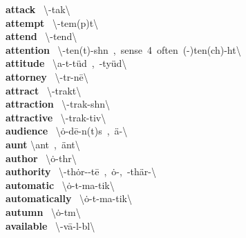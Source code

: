 \documentclass[10pt,a4paper]{article}
\begin{document}
\begin{multicols}{2}
\textbf{ attack }\quad \ \textbackslash \textschwa -\textprimstress tak\textbackslash \\
\textbf{ attempt }\quad \ \textbackslash \textschwa -\textprimstress tem(p)t\textbackslash \\
\textbf{ attend }\quad \ \textbackslash \textschwa -\textprimstress tend\textbackslash \\
\textbf{ attention }\quad \ \textbackslash \textschwa -\textprimstress ten(t)-sh\textschwa n\ ,\ sense\ 4\ often\ (\textschwa -)\textsecstress ten(ch)-\textprimstress h\textschwa t\textbackslash \\
\textbf{ attitude }\quad \ \textbackslash \textprimstress a-t\textschwa -\textsecstress t\"{u}d\ ,\ -\textsecstress ty\"{u}d\textbackslash \\
\textbf{ attorney }\quad \ \textbackslash \textschwa -\textprimstress t\textschwa r-n\={e}\textbackslash \\
\textbf{ attract }\quad \ \textbackslash \textschwa -\textprimstress trakt\textbackslash \\
\textbf{ attraction }\quad \ \textbackslash \textschwa -\textprimstress trak-sh\textschwa n\textbackslash \\
\textbf{ attractive }\quad \ \textbackslash \textschwa -\textprimstress trak-tiv\textbackslash \\
\textbf{ audience }\quad \ \textbackslash \textprimstress \.{o}-d\={e}-\textschwa n(t)s\ ,\ \textprimstress \"{a}-\textbackslash \\
\textbf{ aunt }\quad \textbackslash \textprimstress ant\ ,\ \textprimstress \"{a}nt\textbackslash \\
\textbf{ author }\quad \ \textbackslash \textprimstress \.{o}-th\textschwa r\textbackslash \\
\textbf{ authority }\quad \ \textbackslash \textschwa -\textprimstress th\.{o}r-\textschwa -t\={e}\ ,\ \.{o}-,\ -\textprimstress th\"{a}r-\textbackslash \\
\textbf{ automatic }\quad \ \textbackslash \textsecstress \.{o}-t\textschwa -\textprimstress ma-tik\textbackslash \\
\textbf{ automatically }\quad \ \textbackslash \textsecstress \.{o}-t\textschwa -\textprimstress ma-tik\textbackslash \\
\textbf{ autumn }\quad \ \textbackslash \textprimstress \.{o}-t\textschwa m\textbackslash \\
\textbf{ available }\quad \ \textbackslash \textschwa -\textprimstress v\={a}-l\textschwa -b\textschwa l\textbackslash \\

\end{multicols}
\end{document}
